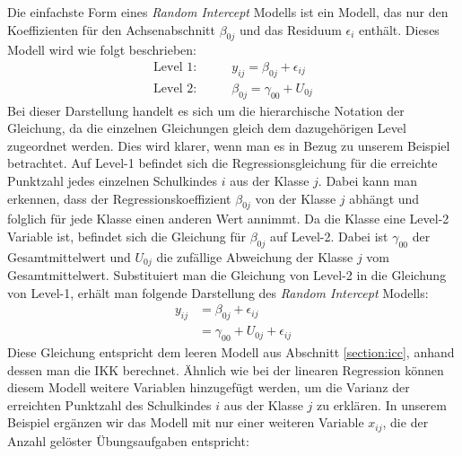 \documentclass[12pt]{article}\usepackage[]{graphicx}\usepackage[]{color}
\begin{document}
Die einfachste Form eines \textit{Random Intercept} Modells ist ein Modell, das nur den Koeffizienten für den Achsenabschnitt $\beta_{0j}$ und das Residuum $\epsilon_i$ enthält. Dieses Modell wird wie folgt beschrieben:
\begin{equation}
\begin{split}	
\text{Level 1:} & \qquad y_{ij} 	= \beta_{0j} + \epsilon_{ij}\\
\text{Level 2:} & \qquad \beta_{0j} = \gamma_{00} + U_{0j}
\end{split}	
\end{equation} 
Bei dieser Darstellung handelt es sich um die hierarchische Notation der Gleichung, da die einzelnen Gleichungen gleich dem dazugehörigen Level zugeordnet werden. Dies wird klarer, wenn man es in Bezug zu unserem Beispiel betrachtet. Auf Level-1 befindet sich die Regressionsgleichung für die erreichte Punktzahl jedes einzelnen Schulkindes $i$ aus der Klasse $j$. Dabei kann man erkennen, dass der Regressionskoeffizient $\beta_{0j}$ von der Klasse $j$ abhängt und folglich für jede Klasse einen anderen Wert annimmt. Da die Klasse eine Level-2 Variable ist, befindet sich die Gleichung für $\beta_{0j}$ auf Level-2. Dabei ist $\gamma_{00}$ der Gesamtmittelwert und $U_{0j}$ die zufällige Abweichung der Klasse $j$ vom Gesamtmittelwert. Substituiert man die Gleichung von Level-2 in die Gleichung von Level-1, erhält man folgende Darstellung des \textit{Random Intercept} Modells:
\begin{equation}
\begin{split}
y_{ij} 	& = \beta_{0j} + \epsilon_{ij}\\
		& = \gamma_{00} + U_{0j} + \epsilon_{ij}
\end{split}
\end{equation}
Diese Gleichung entspricht dem leeren Modell aus Abschnitt \ref{section:icc}, anhand dessen man die IKK berechnet. Ähnlich wie bei der linearen Regression können diesem Modell weitere Variablen hinzugefügt werden, um die Varianz der erreichten Punktzahl des Schulkindes $i$ aus der Klasse $j$ zu erklären. In unserem Beispiel ergänzen wir das Modell mit nur einer weiteren Variable $x_{ij}$, die der Anzahl gelöster Übungsaufgaben entspricht:
\end{document}

